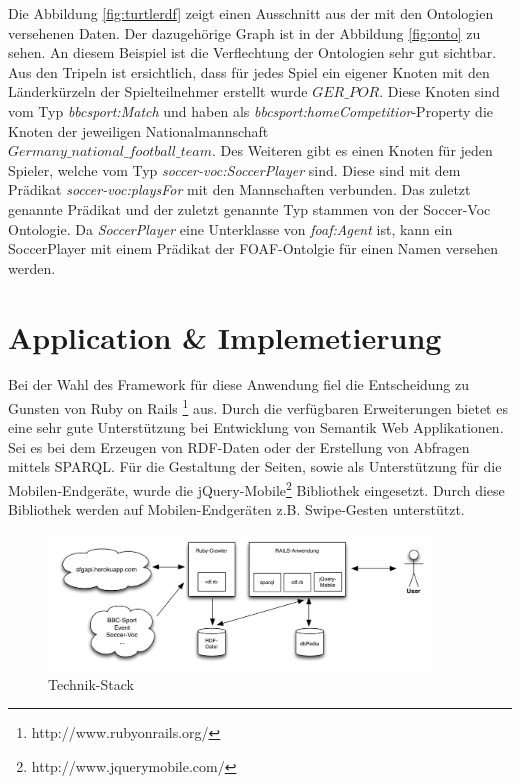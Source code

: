 \documentclass[runningheads,a4paper]{llncs}
\begin{document}
Die Abbildung \ref{fig:turtlerdf} zeigt einen Ausschnitt aus der mit den Ontologien versehenen Daten. Der dazugehörige Graph ist in der Abbildung \ref{fig:onto} zu sehen. An diesem Beispiel ist die Verflechtung der Ontologien sehr gut sichtbar.
Aus den Tripeln ist ersichtlich, dass für jedes Spiel ein eigener Knoten mit den Länderkürzeln der Spielteilnehmer erstellt wurde \(GER\_POR\). Diese Knoten sind vom Typ \textit{bbcsport:Match} und haben als \textit{bbcsport:homeCompetitior}-Property die Knoten der jeweiligen Nationalmannschaft\\ \(Germany\_national\_football\_team\). 
Des Weiteren gibt es einen Knoten für jeden Spieler, welche vom Typ \textit{soccer-voc:SoccerPlayer} sind. Diese sind mit dem Prädikat \textit{soccer-voc:playsFor} mit den Mannschaften verbunden. Das zuletzt genannte Prädikat und der zuletzt genannte Typ stammen von der Soccer-Voc Ontologie. Da \textit{SoccerPlayer} eine Unterklasse von \textit{foaf:Agent} ist, kann ein SoccerPlayer mit einem Prädikat der FOAF-Ontolgie für einen Namen versehen werden.
\section{Application \& Implemetierung}


Bei der Wahl des Framework für diese Anwendung fiel die Entscheidung zu Gunsten von Ruby on Rails \footnote{http://www.rubyonrails.org/} aus. Durch die verfügbaren Erweiterungen bietet es eine sehr gute Unterstützung bei Entwicklung von Semantik Web Applikationen. Sei es bei dem Erzeugen von RDF-Daten oder der Erstellung von Abfragen mittels SPARQL. Für die Gestaltung der Seiten, sowie als Unterstützung für die Mobilen-Endgeräte, wurde die jQuery-Mobile\footnote{http://www.jquerymobile.com/} Bibliothek eingesetzt. Durch diese Bibliothek werden auf Mobilen-Endgeräten z.B. Swipe-Gesten unterstützt. 

\begin{figure}
\centering
\includegraphics[height=3.6cm]{technik-stack}
\caption{Technik-Stack}
\label{fig:example}
\end{figure}
\end{document}
